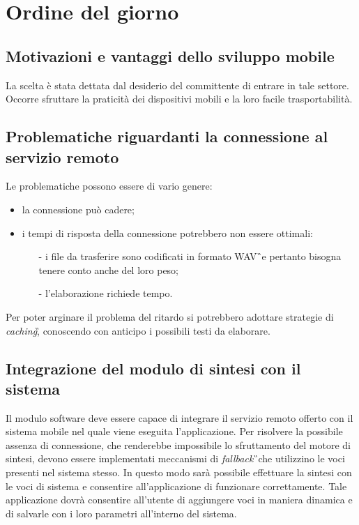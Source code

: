 \section{Ordine del giorno}


\subsection{Motivazioni e vantaggi dello sviluppo mobile}
La scelta è stata dettata dal desiderio del committente di entrare in tale settore. Occorre sfruttare la praticità dei dispositivi mobili e la loro facile trasportabilità. 


\subsection{Problematiche riguardanti la connessione al servizio remoto}
Le problematiche possono essere di vario genere:
\begin{itemize}
\item la connessione può cadere;
\item i tempi di risposta della connessione potrebbero non essere ottimali:
\begin{itemize}
\item[-]i file da trasferire sono codificati in formato WAV\G\ e pertanto 
bisogna tenere conto anche del loro peso;
\item[-]l'elaborazione richiede tempo.
\end{itemize}
\end{itemize}
Per poter arginare il problema del ritardo si potrebbero adottare strategie di 
\textit{caching}\G , conoscendo con anticipo i possibili testi da elaborare.


\subsection{Integrazione del modulo di sintesi con il sistema}
Il modulo software deve essere capace di integrare il servizio remoto offerto con il sistema mobile nel quale viene eseguita l'applicazione. Per risolvere la possibile assenza di connessione, che renderebbe impossibile lo sfruttamento del motore di sintesi, devono essere 
implementati meccanismi di \textit{fallback}\G\ che utilizzino le voci presenti nel sistema stesso. In questo modo sarà possibile effettuare la sintesi con le voci di 
sistema e consentire all'applicazione di funzionare correttamente. Tale applicazione dovrà consentire all'utente di aggiungere voci in maniera 
dinamica e di salvarle con i loro parametri all'interno del sistema.

